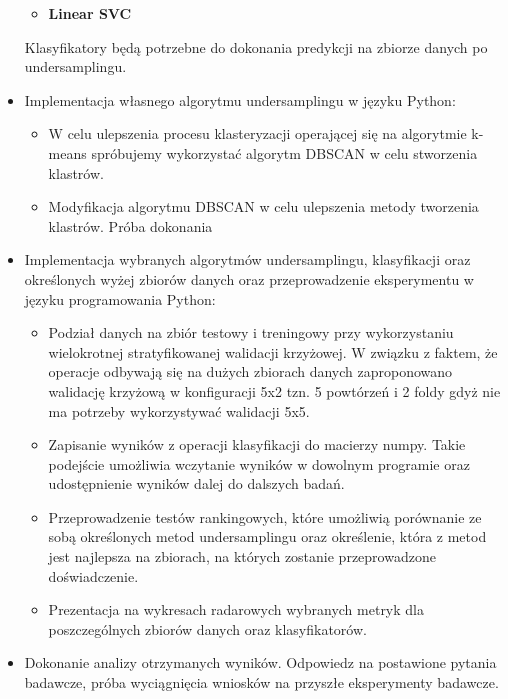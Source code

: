 \documentclass{article}
\begin{document}
\begin{itemize}
\begin{itemize}
        \item \textbf{Linear SVC}
    \end{itemize}
    Klasyfikatory będą potrzebne do dokonania predykcji na zbiorze danych po undersamplingu.
    \item Implementacja  własnego algorytmu undersamplingu w języku Python:
    \begin{itemize}
        \item W celu ulepszenia procesu klasteryzacji operającej się na algorytmie k-means spróbujemy wykorzystać algorytm DBSCAN w celu stworzenia klastrów.
        \item Modyfikacja algorytmu DBSCAN w celu ulepszenia metody tworzenia klastrów. Próba  dokonania  
    \end{itemize}
    \item Implementacja wybranych algorytmów undersamplingu, klasyfikacji oraz określonych wyżej zbiorów danych oraz przeprowadzenie eksperymentu w języku programowania Python:
    \begin{itemize}
     \item Podział danych na zbiór testowy i treningowy przy wykorzystaniu wielokrotnej stratyfikowanej walidacji krzyżowej. W związku z faktem, że operacje odbywają się  na dużych zbiorach danych zaproponowano walidację krzyżową w konfiguracji 5x2 tzn. 5 powtórzeń i 2 foldy gdyż nie ma potrzeby wykorzystywać walidacji 5x5.
     
    \item Zapisanie wyników z operacji klasyfikacji do macierzy numpy. Takie podejście umożliwia wczytanie wyników w dowolnym programie oraz udostępnienie wyników dalej do dalszych badań.
    
    \item Przeprowadzenie testów rankingowych, które umożliwią porównanie ze sobą  określonych metod undersamplingu oraz określenie, która z metod jest najlepsza na zbiorach, na których zostanie przeprowadzone doświadczenie.
    \item Prezentacja na wykresach radarowych wybranych metryk dla poszczególnych zbiorów danych oraz klasyfikatorów.
    \end{itemize}
    \item Dokonanie analizy otrzymanych wyników. Odpowiedz na postawione pytania badawcze, próba wyciągnięcia wniosków na przyszłe eksperymenty badawcze.
\end{itemize}
\newline



\end{document}
